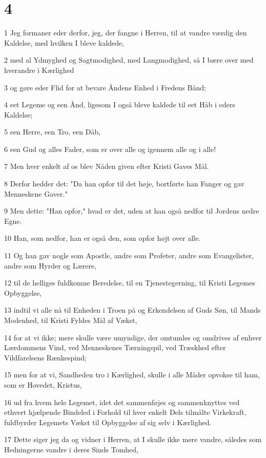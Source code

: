 \chapter{4}

\par 1 Jeg formaner eder derfor, jeg, der fangne i Herren, til at vandre værdig den Kaldelse, med hvilken I bleve kaldede,
\par 2 med al Ydmyghed og Sagtmodighed, med Langmodighed, så I bære over med hverandre i Kærlighed
\par 3 og gøre eder Flid for at bevare Åndens Enhed i Fredens Bånd;
\par 4 eet Legeme og een Ånd, ligesom I også bleve kaldede til eet Håb i eders Kaldelse;
\par 5 een Herre, een Tro, een Dåb,
\par 6 een Gud og alles Fader, som er over alle og igennem alle og i alle!
\par 7 Men hver enkelt af os blev Nåden given efter Kristi Gaves Mål.
\par 8 Derfor hedder det: "Da han opfor til det høje, bortførte han Fanger og gav Menneskene Gaver."
\par 9 Men dette: "Han opfor," hvad er det, uden at han også nedfor til Jordens nedre Egne.
\par 10 Han, som nedfor, han er også den, som opfor højt over alle.
\par 11 Og han gav nogle som Apostle, andre som Profeter, andre som Evangelister, andre som Hyrder og Lærere,
\par 12 til de helliges fuldkomne Beredelse, til en Tjenestegerning, til Kristi Legemes Opbyggelse,
\par 13 indtil vi alle nå til Enheden i Troen på og Erkendelsen af Guds Søn, til Mands Modenhed, til Kristi Fyldes Mål af Vækst,
\par 14 for at vi ikke; mere skulle være umyndige, der omtumles og omdrives af enhver Lærdommens Vind, ved Menneskenes Tærningspil, ved Træskhed efter Vildfarelsens Rænkespind;
\par 15 men for at vi, Sandheden tro i Kærlighed, skulle i alle Måder opvokse til ham, som er Hovedet, Kristus,
\par 16 ud fra hvem hele Legemet, idet det sammenføjes og sammenknyttes ved ethvert hjælpende Bindeled i Forhold til hver enkelt Dels tilmålte Virkekraft, fuldbyrder Legemets Vækst til Opbyggelse af sig selv i Kærlighed.
\par 17 Dette siger jeg da og vidner i Herren, at I skulle ikke mere vandre, således som Hedningerne vandre i deres Sinds Tomhed,
